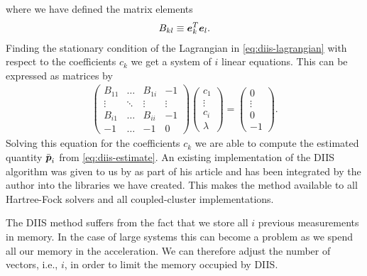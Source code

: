             where we have defined the matrix elements
            \begin{align}
                B_{kl} \equiv \boldsymbol{e}_k^T\boldsymbol{e}_l.
            \end{align}
            Finding the stationary condition of the Lagrangian in
            \autoref{eq:diis-lagrangian} with respect to the coefficients $c_k$
            we get a system of $i$ linear equations.
            This can be expressed as matrices by
            \begin{align}
                \begin{pmatrix}
                    B_{11} & \dots & B_{1i} & -1 \\
                    \vdots & \ddots & \vdots & \vdots \\
                    B_{i1} & \dots & B_{ii} & -1 \\
                    -1 & \dots & -1 & 0
                \end{pmatrix}
                \begin{pmatrix}
                    c_1 \\
                    \vdots \\
                    c_i \\
                    \lambda
                \end{pmatrix}
                = \begin{pmatrix}
                    0 \\
                    \vdots \\
                    0 \\
                    -1
                \end{pmatrix}.
            \end{align}
            Solving this equation for the coefficients $c_k$ we are able to
            compute the estimated quantity $\bar{\boldsymbol{p}}_i$ from
            \autoref{eq:diis-estimate}.
            An existing implementation of the DIIS algorithm was given to us by
            \citeauthor{rolf-nocc} as part of his article 
            \cite{rolf-nocc} and has been integrated by the author into the
            libraries we have created.
            This makes the method available to all Hartree-Fock solvers and all
            coupled-cluster implementations.

            The DIIS method suffers from the fact that we store all $i$ previous
            measurements in memory.
            In the case of large systems this can become a problem as we spend
            all our memory in the acceleration.
            We can therefore adjust the number of vectors, i.e., $i$, in order
            to limit the memory occupied by DIIS.

